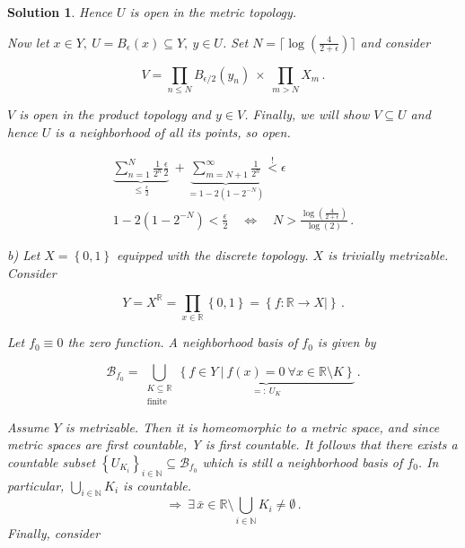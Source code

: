 \documentclass{article}                                                        %
\newtheorem{loesung}{Solution}                                                 %
\begin{document}
\begin{loesung}
  Hence $U$ is open in the metric topology.

  Now let $x \in Y,\ U = B_\epsilon (x) \subseteq Y,\ y \in U$. Set
  $N = \lceil \log(\frac{4}{2+\epsilon}) \rceil $ and consider

  \begin{equation*}
    V = \prod\limits_{n \leq N} B_{\epsilon / 2} (y_n)\ 
    \times\ 
    \prod\limits_{m > N} X_m\,.  
  \end{equation*}
  
  $V$ is open in the product topology and $y \in V$. Finally, we will show 
  $V \subseteq U$ and hence $U$ is a neighborhood of all its points, so open.

  \begin{gather*}
    \underbrace{
      \sum\limits_{n=1}^{N} \frac{1}{2^n}\frac{\epsilon}{2}
    }_{
      \leq \frac{\epsilon}{2}
    }
    \ + \underbrace{
      \sum\limits_{m=N+1}^{\infty} \frac{1}{2^n}
    }_{
      = 1 - 2(1 - 2^{-N})
    }
    \overset{!}{<} \epsilon \\
    1 - 2(1 - 2^{-N}) < \frac{\epsilon}{2}
    \quad\Leftrightarrow\quad
    N > \frac{\log(\frac{4}{2+\epsilon})}{\log(2)}\,.
  \end{gather*}

  \textit{b)} Let $X = \left\{ 0,1 \right\}$ equipped with the discrete
  topology. $X$ is trivially metrizable. Consider 

  \begin{equation*}
    Y = X^{\mathbb{R}} 
    = \prod\limits_{x\in\mathbb{R}} \left\{ 0,1 \right\}
    = \left\{ f : \mathbb{R} \rightarrow X \vert  \right\}\,.
  \end{equation*}
  
  Let $f_0 \equiv 0$ the zero function. A neighborhood basis of $f_0$ is given
  by

  \begin{equation*}
    \mathcal{B}_{f_0} = 
    \bigcup\limits_{\substack{K \subseteq \mathbb{R} \\ \text{finite}}}
    \underbrace{
      \left\{ f \in Y 
      \ \vert\ f(x) = 0\ \forall x \in \mathbb{R}
      \setminus K \right\}
    }_{
      =:\ U_K
    }\,.
  \end{equation*}

  Assume $Y$ is metrizable. Then it is homeomorphic to a metric space, and since
  metric spaces are first countable, Y is first countable. It follows that there
  exists a countable subset  
  $\left\{ U_{K_i} \right\}_{i\in\mathbb{N}} \subseteq  \mathcal{B}_{f_0}$
  which is still a neighborhood basis of $f_0$. In particular, 
  $\bigcup\limits_{i\in\mathbb{N}} K_i$ is countable. 
  $$\Rightarrow\ \exists\, \bar{x} \in \mathbb{R} \setminus 
  \bigcup\limits_{i\in\mathbb{N}} K_i \neq \emptyset\,.$$ Finally, consider 


\end{loesung}
\end{document}
